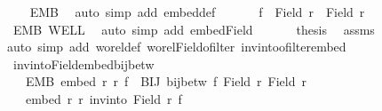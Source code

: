 \begin{isabellebody}
\ \ \isamarkupfalse%
\ EMB\ \isamarkupfalse%
\ {\isacharparenleft}{\kern0pt}auto\ simp\ add{\isacharcolon}{\kern0pt}\ embed{\isacharunderscore}{\kern0pt}def{\isacharparenright}{\kern0pt}\isanewline
\ \ \isamarkupfalse%
\isanewline
\ \ \isamarkupfalse%
\ {\isachardoublequoteopen}f\ {\isacharbackquote}{\kern0pt}\ {\isacharparenleft}{\kern0pt}Field\ r{\isacharparenright}{\kern0pt}\ {\isasymle}\ Field\ r{\isacharprime}{\kern0pt}{\isachardoublequoteclose}\isanewline
\ \ \isamarkupfalse%
\ EMB\ WELL\ \isamarkupfalse%
\ {\isacharparenleft}{\kern0pt}auto\ simp\ add{\isacharcolon}{\kern0pt}\ embed{\isacharunderscore}{\kern0pt}Field{\isacharparenright}{\kern0pt}\isanewline
\ \ \isamarkupfalse%
\isanewline
\ \ \isamarkupfalse%
\ {\isacharquery}{\kern0pt}thesis\ \isamarkupfalse%
\ assms\isanewline
\ \ \isamarkupfalse%
{\isacharparenleft}{\kern0pt}auto\ simp\ add{\isacharcolon}{\kern0pt}\ wo{\isacharunderscore}{\kern0pt}rel{\isacharunderscore}{\kern0pt}def\ wo{\isacharunderscore}{\kern0pt}rel{\isachardot}{\kern0pt}Field{\isacharunderscore}{\kern0pt}ofilter\ inv{\isacharunderscore}{\kern0pt}into{\isacharunderscore}{\kern0pt}ofilter{\isacharunderscore}{\kern0pt}embed{\isacharparenright}{\kern0pt}\isanewline
{}\isamarkupfalse%
%
\endisatagproof
{\isafoldproof}%
%
\isadelimproof
\isanewline
%
\endisadelimproof
\isanewline
{}\isamarkupfalse%
\ inv{\isacharunderscore}{\kern0pt}into{\isacharunderscore}{\kern0pt}Field{\isacharunderscore}{\kern0pt}embed{\isacharunderscore}{\kern0pt}bij{\isacharunderscore}{\kern0pt}betw{\isacharcolon}{\kern0pt}\isanewline
\ \ \ EMB{\isacharcolon}{\kern0pt}\ {\isachardoublequoteopen}embed\ r\ r{\isacharprime}{\kern0pt}\ f{\isachardoublequoteclose}\ \ BIJ{\isacharcolon}{\kern0pt}\ {\isachardoublequoteopen}bij{\isacharunderscore}{\kern0pt}betw\ f\ {\isacharparenleft}{\kern0pt}Field\ r{\isacharparenright}{\kern0pt}\ {\isacharparenleft}{\kern0pt}Field\ r{\isacharprime}{\kern0pt}{\isacharparenright}{\kern0pt}{\isachardoublequoteclose}\isanewline
\ \ \ {\isachardoublequoteopen}embed\ r{\isacharprime}{\kern0pt}\ r\ {\isacharparenleft}{\kern0pt}inv{\isacharunderscore}{\kern0pt}into\ {\isacharparenleft}{\kern0pt}Field\ r{\isacharparenright}{\kern0pt}\ f{\isacharparenright}{\kern0pt}{\isachardoublequoteclose}\isanewline
%
\isadelimproof
%
\endisadelimproof
%
\isatagproof
{}\isamarkupfalse%

\end{isabellebody}
